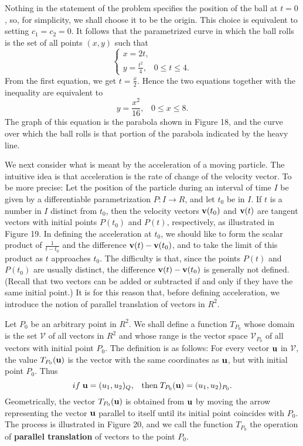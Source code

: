\noindent Nothing in the statement of the problem specifies the position of the ball at $t = 0$, so, for simplicity, we shall choose it to be the origin. This choice is equivalent to setting $c_1 = c_2 = 0$. It follows that the parametrized curve in which the ball rolls is the set of all points $(x, y)$ such that
$$
\left \{ \begin{array}{l}
x= 2t, \\
y= \frac{t^2}{4}, \;\;\; 0 \leq t \leq 4.
\end{array}
\right .
$$
From the first equation, we get $t = \frac{x}{2}$. Hence the two equations together with the inequality are equivalent to
$$
y = \frac{x^2}{16},  \;\;\; 0 \leq x \leq 8.
$$
The graph of this equation is the parabola shown in Figure 18, and the curve over which the ball rolls is that portion of the parabola indicated by the heavy line.


We next consider what is meant by the acceleration of a moving particle. The intuitive idea is that acceleration is the rate of change of the velocity vector. To be more precise: Let the position of the particle during an interval of time $I$ be given by a differentiable parametrization $P: I \rightarrow R$, and let $t_0$ be in $I$. If $t$ is a number in $I$ distinct from $t_0$, then the velocity vectors $\mbox{\bf{v}}(t_0)$ and $\mbox{\bf{v}}(t)$ are tangent vectors with initial points $P(t_0)$ and $P(t)$, respectively, as
illustrated in Figure 19. In defining the acceleration at $t_0$, we should like to form the scalar product of $\frac{1}{t - t_0}$ and the difference $\mbox{\bf{v}}(t) - \mbox{\bf{v}}(t_0)$, and to take the limit of this product as $t$ approaches $t_0$. The difficulty is that, since the points $P(t)$ and $P(t_0)$ are usually distinct, the difference $\mbox{\bf{v}}(t) - \mbox{\bf{v}}(t_0)$ is generally not defined. (Recall that two vectors can be added or subtracted if and only if they have the same initial point.) It is for this reason that, before defining acceleration, we introduce the notion of parallel translation of vectors in $R^2$.



Let $P_0$ be an arbitrary point in $R^2$. We shall define a function $T_{P_0}$ whose domain is the set $\mathcal{V}$ of all vectors in $R^2$ and whose range is the vector space $\mathcal{V}_{P_0}$ of all vectors with initial point $P_0$. The definition is as follows: For every vector $\mbox{\bf{u}}$ in $\mathcal{V}$, the value $T_{P_0}(\mbox{\bf{u}})$ is the vector with the same coordinates as $\mbox{\bf{u}}$, but with initial point $P_0$. Thus
$$
if\; \mbox{\bf{u}} = (u_1, u_2)_Q, \;\;\;\mbox{then}\; T_{P_0}(\mbox{\bf{u}}) = (u_1, u_2)_{P_0} .
$$
Geometrically, the vector $T_{P_0}(\mbox{\bf{u}})$ is obtained from $\mbox{\bf{u}}$ by moving the arrow representing the vector $\mbox{\bf{u}}$ parallel to itself until its initial point coincides with $P_0$. The process is illustrated in Figure 20, and we call the function $T_{P_0}$ the operation of \textbf{parallel translation} of vectors to the point $P_0$.

